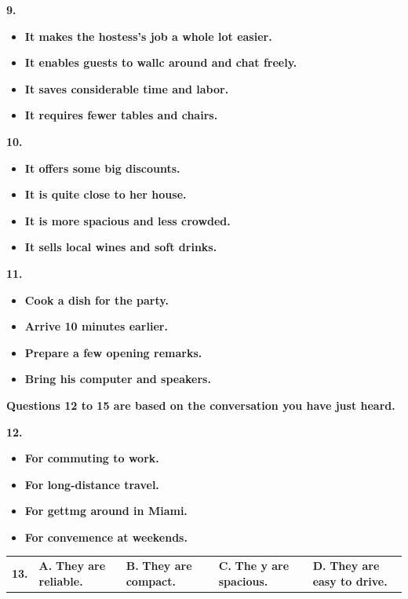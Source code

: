 \documentclass[UTF8,11pt]{ctexart}
\begin{document}
\textbf{9.}


\begin{itemize}[leftmargin=2em,itemsep=.2em,topsep=.4em]\item[A.] \textbf{It makes the hostess's job a whole lot easier.}
\item[B.] \textbf{It enables guests to wallc around and chat freely.}
\item[C.] \textbf{It saves considerable time and labor.}
\item[D.] \textbf{It requires fewer tables and chairs.}
\end{itemize}

\textbf{10.}


\begin{itemize}[leftmargin=2em,itemsep=.2em,topsep=.4em]\item[A.] \textbf{It offers some big discounts.}
\item[B.] \textbf{It is quite close to her house.}
\item[C.] \textbf{It is more spacious and less crowded.}
\item[D.] \textbf{It sells local wines and soft drinks.}
\end{itemize}

\textbf{11.}


\begin{itemize}[leftmargin=2em,itemsep=.2em,topsep=.4em]\item[A.] \textbf{Cook a dish for the party.}
\item[B.] \textbf{Arrive 10 minutes earlier.}
\item[C.] \textbf{Prepare a few opening remarks.}
\item[D.] \textbf{Bring his computer and speakers.}
\end{itemize}

\textbf{Questions 12 to 15 are based on the conversation you have just heard.}


\textbf{12.}


\begin{itemize}[leftmargin=2em,itemsep=.2em,topsep=.4em]\item[A.] \textbf{For commuting to work.}
\item[B.] \textbf{For long-distance travel.}
\item[C.] \textbf{For gettmg around in Miami.}
\item[D.] \textbf{For convemence at weekends.}
\end{itemize}

\noindent\begin{tabularx}{\linewidth}{@{}lXXXX@{}}\textbf{13.} & \textbf{A.} \textbf{They are reliable.} & \textbf{B.} \textbf{They are compact.} & \textbf{C.} \textbf{The y are spacious.} & \textbf{D.} \textbf{They are easy to drive.}\\\end{tabularx}\par
\end{document}
